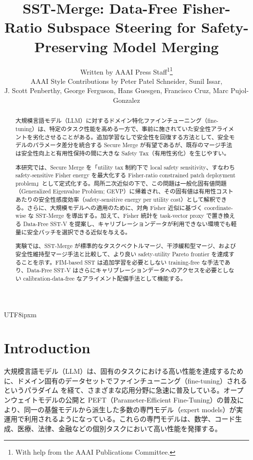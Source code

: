 \documentclass[letterpaper]{article} %
\title{SST-Merge: Data-Free Fisher-Ratio Subspace Steering for Safety-Preserving Model Merging}
\author{
    Written by AAAI Press Staff\textsuperscript{\rm 1}\thanks{With help from the AAAI Publications Committee.}\\
    AAAI Style Contributions by Peter Patel Schneider,
    Sunil Issar,\\
    J. Scott Penberthy,
    George Ferguson,
    Hans Guesgen,
    Francisco Cruz\equalcontrib\corresponding,
    Marc Pujol-Gonzalez\equalcontrib\corresponding
}
\begin{document}
\begin{CJK*}{UTF8}{ipxm}

\maketitle

\begin{abstract}
大規模言語モデル（LLM）に対するドメイン特化ファインチューニング（fine-tuning）は、特定のタスク性能を高める一方で、事前に施されていた安全性アライメントを劣化させることがある。追加学習なしで安全性を回復する方法として、安全モデルのパラメータ差分を統合する Secure Merge が有望であるが、既存のマージ手法は安全性向上と有用性保持の間に大きな Safety Tax（有用性劣化）を生じやすい。

本研究では、Secure Merge を「utility tax 制約下で local safety sensitivity、すなわち safety-sensitive Fisher energy を最大化する Fisher-ratio constrained patch deployment problem」として定式化する。局所二次近似の下で、この問題は一般化固有値問題（Generalized Eigenvalue Problem; GEVP）に帰着され、その固有値は有用性コストあたりの安全性感度効率（safety-sensitive energy per utility cost）として解釈できる。さらに、大規模モデルへの適用のために、対角 Fisher 近似に基づく coordinate-wise な SST-Merge を導出する。加えて、Fisher 統計を task-vector proxy で置き換える Data-Free SST-V を提案し、キャリブレーションデータが利用できない環境でも軽量に安全パッチを選択できる近似を与える。

実験では、SST-Merge が標準的なタスクベクトルマージ、干渉緩和型マージ、および安全性維持型マージ手法と比較して、より良い safety-utility Pareto frontier を達成することを示す。FIM-based SST は追加学習を必要としない training-free な手法であり、Data-Free SST-V はさらにキャリブレーションデータへのアクセスを必要としない calibration-data-free なアライメント配備手法として機能する。
\end{abstract}

\section{Introduction}
大規模言語モデル（LLM）は、固有のタスクにおける高い性能を達成するために、ドメイン固有のデータセットでファインチューニング（fine-tuning）されるというパラダイム\citep{devlin2019bert, raffel2020t5, brown2020language, touvron2023llama2} を経て、さまざまな応用分野に急速に普及している。オープンウェイトモデルの公開と PEFT（Parameter-Efficient Fine-Tuning）の普及により、同一の基盤モデルから派生した多数の専門モデル（expert models）が実運用で利用されるようになっている\citep{wolf2019transformers}。これらの専門モデルは、数学、コード生成、医療、法律、金融などの個別タスクにおいて高い性能を発揮する。


\end{CJK*}
\end{document}
